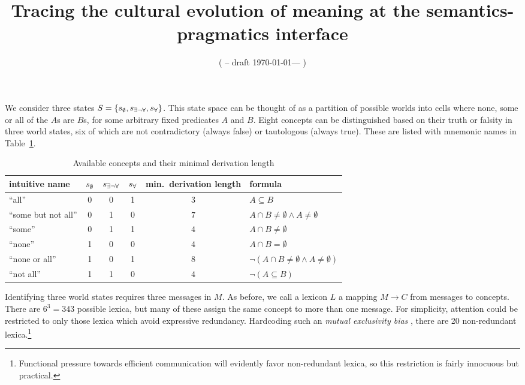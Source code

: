 \documentclass[a4paper]{article}
\title{Tracing the cultural evolution of meaning at the semantics-pragmatics interface}
\author{%
    ( -- draft \today --- )
}
\date{}
\newcommand{\set}[1]{\left\{#1\right\}}
\newcommand{\States}{\ensuremath{S}\xspace}		%
\newcommand{\state}{\ensuremath{s}\xspace}		%
\newcommand{\mystate}[1]{\ensuremath{\state_{\text{#1}}}\xspace} %
\newcommand{\Messgs}{\ensuremath{M}\xspace}		%
\newcommand{\ssome}{\mystate{\ensuremath{\exists\neg\forall}}}
\newcommand{\sall}{\mystate{\ensuremath{\forall}}}
\newcommand{\snone}{\mystate{\ensuremath{\emptyset}}}
\begin{document}
We consider three states $\States = \set{\snone, \ssome, \sall}$. This state space can be
thought of as a partition of possible worlds into cells where none, some or all of the $A$s are
$B$s, for some arbitrary fixed predicates $A$ and $B$. Eight concepts can be distinguished
based on their truth or falsity in three world states, six of which are not contradictory
(always false) or tautologous (always true). These are listed with mnemonic names in
Table~\ref{tab:concepts}. 

\begin{table}
  \centering
\begin{center}
  \begin{tabular}{lccccl}
    \toprule
    intuitive name
    & \snone
    & \ssome
    & \sall
    & min.~derivation length
    & formula
    \\ \midrule
    ``all''
    & 0
    & 0
    & 1
    & $3$
    & $A \subseteq B$
    \\
    ``some but not all''
    & 0
    & 1
    & 0
    & $7$
    & $A \cap B \neq \emptyset \wedge A \neq \emptyset$
    \\    
    ``some''
    & 0
    & 1
    & 1
    & $4$
    & $A \cap B \neq \emptyset$
    \\
    ``none''
    & 1
    & 0
    & 0
    & $4$
    & $A \cap B = \emptyset$
    \\
    ``none or all''
    & 1
    & 0
    & 1
    & $8$
    & $\neg(A \cap B \neq \emptyset \wedge A \neq \emptyset)$
    \\
    ``not all''
    & 1
    & 1
    & 0
    & $4$
    & $\neg (A \subseteq B)$
    \\
    \bottomrule
  \end{tabular}
\end{center}
\caption{Available concepts and their minimal derivation length}
\label{tab:concepts}
\end{table}

Identifying three world states requires three messages in $\Messgs$. As before, we call a
lexicon $L$ a mapping $\Messgs \rightarrow C$ from messages to concepts. There are $6^3 = 343$
possible lexica, but many of these assign the same concept to more than one message. For
simplicity, attention could be restricted to only those lexica which avoid expressive
redundancy. Hardcoding such an \emph{mutual exclusivity bias}
\citep[e.g.][]{Clark2009:Lexical-Meaning}, there are 20 non-redundant
lexica.\footnote{Functional pressure towards efficient communication will evidently favor
  non-redundant lexica, so this restriction is fairly innocuous but practical.}
\end{document}
